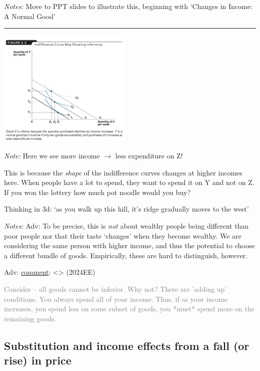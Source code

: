 \documentclass[]{article}
\begin{document}
\emph{Notes:}
Move to PPT slides to illustrate this,
beginning with `Changes in Income: A Normal Good'

\begin{center}\rule{0.5\linewidth}{\linethickness}\end{center}

\includegraphics[height=2.2in]{picsfigs/inferiorgood.png}

\emph{Note:} Here we see more income \(\rightarrow\) less expenditure on Z!

This is because the \emph{shape} of the indifference curves changes at higher incomes here.
When people have a lot to spend, they want to spend it on Y and not on Z.
If you won the lottery how much pot noodle would you buy?

\bigskip

Thinking in 3d: `as you walk up this hill, it's ridge gradually moves to the west'

\emph{Notes:} Adv: To be precise, this is \emph{not} about wealthy people being different than poor people
nor that their taste `changes' when they become wealthy.
We are considering the same person with higher income,
and thus the potential to choose a different bundle of goods.
Empirically, these are hard to distinguish, however.

\textcolor{RawSienna}{Adv:}
\href{}{comment}: \textless{}\textgreater{} (2024EE)

\textcolor{gray}{Consider -- all goods cannot be inferior. Why not?
There are 'adding up' conditions.
You always spend all of your income. Thus, if as your income increases, you spend less on some subset of goods,
you *must* spend more on the remaining goods.}

\hypertarget{substitution-and-income-effects-from-a-fall-or-rise-in-price}{%
\subsection{Substitution and income effects from a fall (or rise) in price}\label{substitution-and-income-effects-from-a-fall-or-rise-in-price}}
\end{document}

